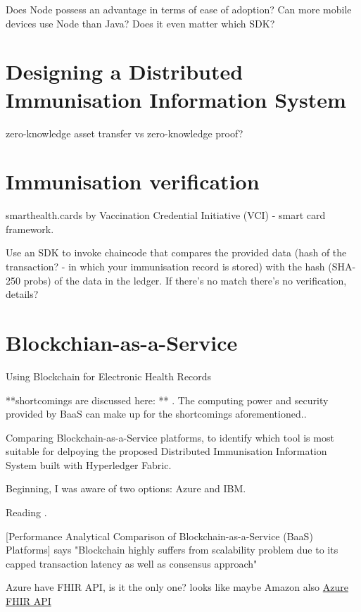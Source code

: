 \documentclass{report}
\begin{document}
\begin{flushleft}
Does Node possess an advantage in terms of ease of adoption? Can more mobile devices use Node than Java? Does it even matter which SDK? 
\chapter{Designing a Distributed Immunisation Information System}
zero-knowledge asset transfer vs zero-knowledge proof? 

\chapter{Immunisation verification}
smarthealth.cards by Vaccination Credential Initiative (VCI) - smart card framework.\linebreak[1]

Use an SDK to invoke chaincode that compares the provided data (hash of the transaction? - in which your immunisation record is stored) with the hash (SHA-250 probs) of the data in the ledger. If there's no match there's no verification, details?

\chapter{Blockchian-as-a-Service}

Using Blockchain for Electronic Health Records \href{'https://ieeexplore.ieee.org/stamp/stamp.jsp?tp=&arnumber=8863359'} \cite{shahnaz_using_2019}


**shortcomings are discussed here: \href{'https://ieeexplore.ieee.org/document/9284197'} \cite{brotsis_security_2020} ** . The computing power and security provided by BaaS can make up for the shortcomings aforementioned.\cite{song_research_2021}.

Comparing Blockchain-as-a-Service platforms, to identify which tool is most suitable for delpoying the proposed Distributed Immunisation Information System built with Hyperledger Fabric.\linebreak[1]

Beginning, I was aware of two options: Azure and IBM.\linebreak[1]

Reading \cite{onik_performance_2019}.\linebreak[1]

[Performance Analytical Comparison of Blockchain-as-a-Service (BaaS) Platforms] says "Blockchain highly suffers from scalability problem due to its capped transaction
latency as well as consensus approach"\linebreak[1]

Azure have FHIR API, is it the only one? looks like maybe Amazon also \href{'https://azure.microsoft.com/en-gb/services/azure-api-for-fhir/?ocid=AID754288&wt.mc_id=azfr-c9-scottha%2CCFID0475'}{Azure FHIR API}




\end{flushleft}

\printbibliography
\end{document}
